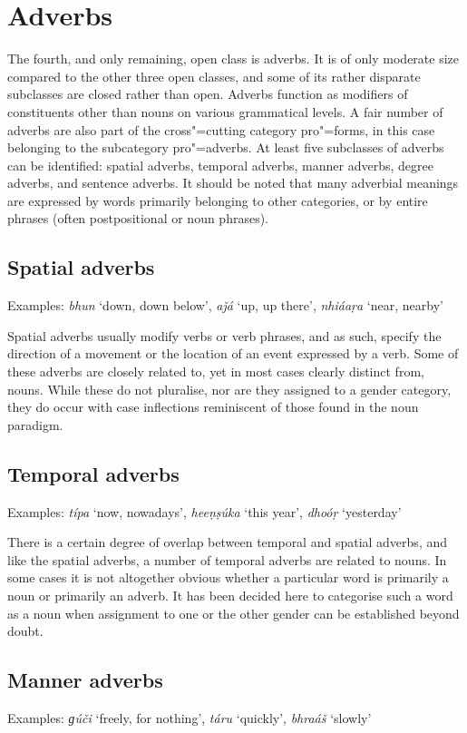 \section{Adverbs}
\label{sec:3b-5}
The fourth, and only remaining, open class is adverbs. It is of only moderate size compared to the other three open classes, and some of its rather disparate subclasses are closed rather than open. Adverbs function as modifiers of constituents other than nouns on various grammatical levels. A fair number of adverbs are also part of the cross"=cutting category pro"=forms, in this case belonging to the subcategory pro"=adverbs. At least five subclasses of adverbs can be identified: spatial adverbs, temporal adverbs, manner adverbs, degree adverbs, and sentence adverbs. It should be noted that many adverbial meanings are expressed by words primarily belonging to other categories, or by entire phrases (often postpositional or noun phrases).


\subsection{Spatial adverbs}
\label{subsec:3b-5-1}
Examples: \textit{bhun} `down, down below', \textit{aǰá} `up, up there', \textit{nhiáaṛa} `near, nearby'


Spatial adverbs usually modify verbs or verb phrases, and as such, specify the direction of a movement or the location of an event expressed by a verb. Some of these adverbs are closely related to, yet in most cases clearly distinct from, nouns. While these do not pluralise, nor are they assigned to a gender category, they do occur with case inflections reminiscent of those found in the noun paradigm. 


\subsection{Temporal adverbs}
\label{subsec:3b-5-2}
Examples: \textit{típa} `now, nowadays', \textit{heeṇṣúka} `this year', \textit{dhoóṛ} `yesterday'


There is a certain degree of overlap between temporal and spatial adverbs, and like the spatial adverbs, a number of temporal adverbs are related to nouns. In some cases it is not altogether obvious whether a particular word is primarily a noun or primarily an adverb. It has been decided here to categorise such a word as a noun when assignment to one or the other gender can be established beyond doubt.


\subsection{Manner adverbs}
\label{subsec:3b-5-3}
Examples: \textit{ɡúči} `freely, for nothing', \textit{táru} `quickly', \textit{bhraáš} `slowly'


